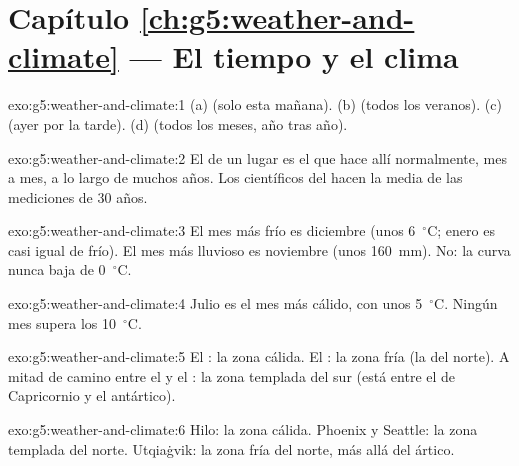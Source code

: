 \section*{Capítulo \ref{ch:g5:weather-and-climate} --- El tiempo y el clima}

\begin{solution}{exo:g5:weather-and-climate:1}
(a)  (solo esta mañana). (b)  (todos los veranos). (c) 
(ayer por la tarde). (d)  (todos los meses, año tras año).
\end{solution}

\begin{solution}{exo:g5:weather-and-climate:2}
El  de un lugar es el  que hace allí normalmente, mes a mes, a
lo largo de muchos años. Los científicos del  hacen la media de las
mediciones de 30 años.
\end{solution}

\begin{solution}{exo:g5:weather-and-climate:3}
El mes más frío es diciembre (unos 6~$^\circ$C; enero es casi igual de
frío). El mes más lluvioso es noviembre (unos 160~mm). No: la curva nunca
baja de 0~$^\circ$C.
\end{solution}

\begin{solution}{exo:g5:weather-and-climate:4}
Julio es el mes más cálido, con unos 5~$^\circ$C. Ningún mes supera los
10~$^\circ$C.
\end{solution}

\begin{solution}{exo:g5:weather-and-climate:5}
El : la zona cálida. El : la zona fría (la del norte). A
mitad de camino entre el  y el : la zona templada del sur
(está entre el  de Capricornio y el  antártico).
\end{solution}

\begin{solution}{exo:g5:weather-and-climate:6}
Hilo: la zona cálida. Phoenix y Seattle: la zona templada del norte.
Utqiaġvik: la zona fría del norte, más allá del  ártico.
\end{solution}

